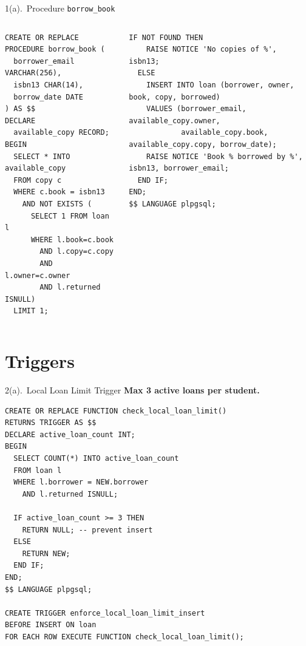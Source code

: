 \documentclass{beamer}
\begin{document}
\begin{frame}[fragile]{1(a).\ Procedure \texttt{borrow\_book}}
\vspace{-0.3em}
\begin{columns}[t,onlytextwidth]
\begin{lstlisting}[numbers=none]
CREATE OR REPLACE PROCEDURE borrow_book (
  borrower_email VARCHAR(256),
  isbn13 CHAR(14),
  borrow_date DATE
) AS $$
DECLARE
  available_copy RECORD;
BEGIN
  SELECT * INTO available_copy
  FROM copy c
  WHERE c.book = isbn13
    AND NOT EXISTS (
      SELECT 1 FROM loan l
      WHERE l.book=c.book
        AND l.copy=c.copy
        AND l.owner=c.owner
        AND l.returned ISNULL)
  LIMIT 1;
\end{lstlisting}

\begin{lstlisting}[numbers=none]
  IF NOT FOUND THEN
    RAISE NOTICE 'No copies of %', isbn13;
  ELSE
    INSERT INTO loan (borrower, owner, book, copy, borrowed)
    VALUES (borrower_email, available_copy.owner,
            available_copy.book, available_copy.copy, borrow_date);
    RAISE NOTICE 'Book % borrowed by %', isbn13, borrower_email;
  END IF;
END;
$$ LANGUAGE plpgsql;
\end{lstlisting}
\end{columns}
\end{frame}

\section{Triggers}
\begin{frame}[fragile]{2(a).\ Local Loan Limit Trigger}
\textbf{Max 3 active loans per student.}
\begin{lstlisting}
CREATE OR REPLACE FUNCTION check_local_loan_limit()
RETURNS TRIGGER AS $$
DECLARE active_loan_count INT;
BEGIN
  SELECT COUNT(*) INTO active_loan_count
  FROM loan l
  WHERE l.borrower = NEW.borrower
    AND l.returned ISNULL;

  IF active_loan_count >= 3 THEN
    RETURN NULL; -- prevent insert
  ELSE
    RETURN NEW;
  END IF;
END;
$$ LANGUAGE plpgsql;

CREATE TRIGGER enforce_local_loan_limit_insert
BEFORE INSERT ON loan
FOR EACH ROW EXECUTE FUNCTION check_local_loan_limit();
\end{lstlisting}
\end{frame}
\end{document}
